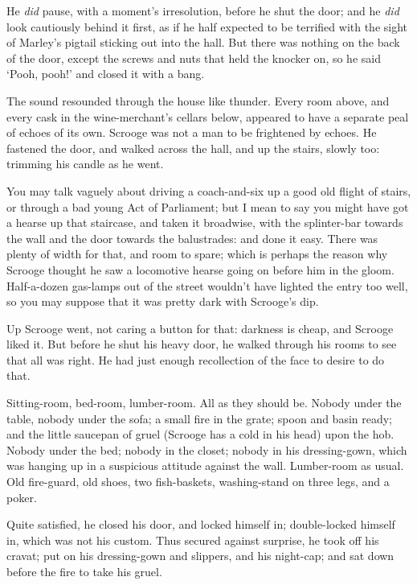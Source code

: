 \documentclass[11pt,twoside]{article}\makeatletter
\begin{document}
He \textit{did} pause, with a moment's irresolution, before he shut the door; and he \textit{did} look cautiously behind it first, as if he half expected to be terrified with the sight of Marley's pigtail sticking out into the hall. But there was nothing on the back of the door, except the screws and nuts that held the knocker on, so he said ‘Pooh, pooh!’ and closed it with a bang.\par
The sound resounded through the house like thunder. Every room above, and every cask in the wine-merchant's cellars below, appeared to have a separate peal of echoes of its own. Scrooge was not a man to be frightened by echoes. He fastened the door, and walked across the hall, and up the stairs, slowly too: trimming his candle as he went. \par
You may talk vaguely about driving a coach-and-six up a good old flight of stairs, or through a bad young Act of Parliament; but I mean to say you might have got a hearse up that staircase, and taken it broadwise, with the splinter-bar towards the wall and the door towards the balustrades: and done it easy. There was plenty of width for that, and room to spare; which is perhaps the reason why Scrooge thought he saw a locomotive hearse going on before him in the gloom. Half-a-dozen gas-lamps out of the street wouldn't have lighted the entry too well, so you may suppose that it was pretty dark with Scrooge's dip.\par
Up Scrooge went, not caring a button for that: darkness is cheap, and Scrooge liked it. But before he shut his heavy door, he walked through his rooms to see that all was right. He had just enough recollection of the face to desire to do that. \par
Sitting-room, bed-room, lumber-room. All as they should be. Nobody under the table, nobody under the sofa; a small fire in the grate; spoon and basin ready; and the little saucepan of gruel (Scrooge has a cold in his head) upon the hob. Nobody under the bed; nobody in the closet; nobody in his dressing-gown, which was hanging up in a suspicious attitude against the wall. Lumber-room as usual. Old fire-guard, old shoes, two fish-baskets, washing-stand on three legs, and a poker. \par
Quite satisfied, he closed his door, and locked himself in; double-locked himself in, which was not his custom. Thus secured against surprise, he took off his cravat; put on his dressing-gown and slippers, and his night-cap; and sat down before the fire to take his gruel.\par
\end{document}

